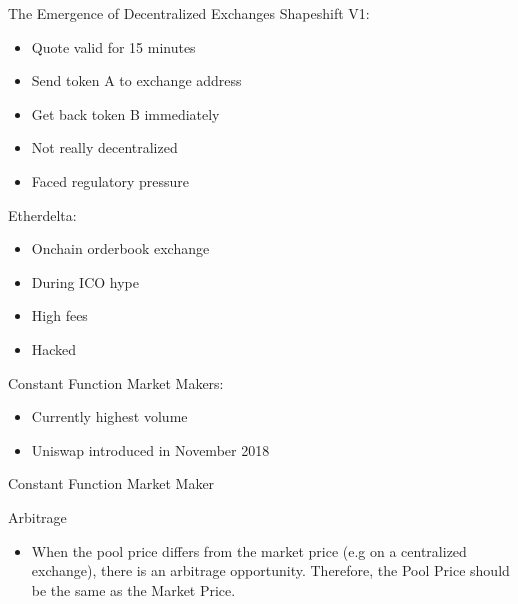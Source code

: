 \documentclass[]{beamer}
\begin{document}
\begin{frame}{The Emergence of Decentralized Exchanges}
Shapeshift V1:
\begin{itemize}
	\item Quote valid for 15 minutes
	\item Send token A to exchange address
	\item Get back token B immediately
	\item Not really decentralized
	\item Faced regulatory pressure
\end{itemize}
\vspace{0.5cm}

Etherdelta:
\begin{itemize}
	\item Onchain orderbook exchange %
	\item During ICO hype
	\item High fees
	\item Hacked
\end{itemize}

Constant Function Market Makers:
\begin{itemize}
	\item Currently highest volume
	\item Uniswap introduced in November 2018
\end{itemize}
\end{frame}

\begin{frame}{Constant Function Market Maker}

	\begin{figure}	
		\centering
		
	\end{figure}


\end{frame}


\begin{frame}{Arbitrage}
	\begin{figure}
		\begin{tikzpicture}
		
		\end{tikzpicture}
	\end{figure}
	\begin{itemize}
		\item When the pool price differs from the market price (e.g on a centralized exchange), there is an arbitrage opportunity. Therefore, the Pool Price should be the same as the Market Price.
	\end{itemize}	
\end{frame}
\end{document}
